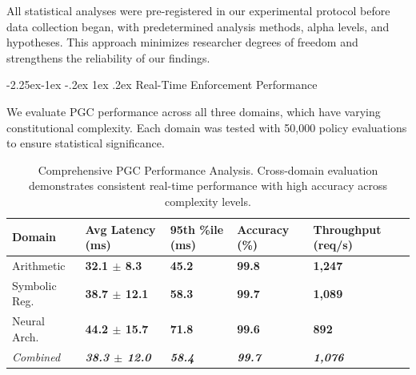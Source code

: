 \documentclass[manuscript,screen,review,anonymous,9pt]{acmart}
\makeatletter
\renewcommand\subsection{\@startsection{subsection}{2}{\z@}%
  {-2.25ex\@plus -1ex \@minus -.2ex}%
  {1ex \@plus .2ex}%
  {\normalfont\large\bfseries}}
\newcommand{\tablesize}{\tiny}
\newcommand{\tablenumfmt}[1]{\textbf{#1}}
\newcommand{\tableheader}[1]{\textbf{#1}}
\makeatother
\begin{document}
All statistical analyses were pre-registered in our experimental protocol before data collection began, with predetermined analysis methods, alpha levels, and hypotheses. This approach minimizes researcher degrees of freedom and strengthens the reliability of our findings.

\subsection{Real-Time Enforcement Performance}
\label{subsec:pgc_performance}

We evaluate PGC performance across all three domains, which have varying constitutional complexity. Each domain was tested with 50,000 policy evaluations to ensure statistical significance.

\begin{table}[htbp]
	\centering
	\caption{Comprehensive PGC Performance Analysis. Cross-domain evaluation demonstrates consistent real-time performance with high accuracy across complexity levels.}
	\label{tab:pgc_comprehensive}
	\tablesize
	\begin{tabular}{@{}l>{\centering\arraybackslash}p{1.4cm}>{\centering\arraybackslash}p{1.4cm}>{\centering\arraybackslash}p{1.2cm}>{\centering\arraybackslash}p{1.4cm}@{}}
		\toprule
		\tableheader{Domain} & \tableheader{Avg Latency (ms)}         & \tableheader{95th \%ile (ms)} & \tableheader{Accuracy (\%)} & \tableheader{Throughput (req/s)} \\
		\midrule
		Arithmetic           & \tablenumfmt{32.1 $ \pm $ 8.3}           & \tablenumfmt{45.2}            & \tablenumfmt{99.8}          & \tablenumfmt{1,247}              \\
		Symbolic Reg.        & \tablenumfmt{38.7 $ \pm $ 12.1}          & \tablenumfmt{58.3}            & \tablenumfmt{99.7}          & \tablenumfmt{1,089}              \\
		Neural Arch.         & \tablenumfmt{44.2 $ \pm $ 15.7}          & \tablenumfmt{71.8}            & \tablenumfmt{99.6}          & \tablenumfmt{892}                \\
		\midrule
		\textit{Combined}    & \textit{\tablenumfmt{38.3 $ \pm $ 12.0}} & \textit{\tablenumfmt{58.4}}   & \textit{\tablenumfmt{99.7}} & \textit{\tablenumfmt{1,076}}     \\
		\bottomrule
	\end{tabular}
\end{table}
\end{document}
